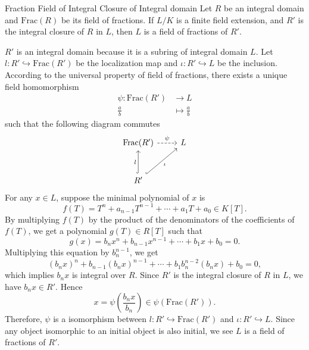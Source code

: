 \begin{proposition}{Fraction Field of Integral Closure of Integral domain}{}
    Let $R$ be an integral domain and $\mathrm{Frac}(R)$ be its field of fractions. If $L/K$ is a finite field extension, and $R'$ is the integral closure of $R$ in $L$, then $L$ is a field of fractions of $R'$.
\end{proposition}
\begin{prf}
    $R'$ is an integral domain because it is a subring of integral domain $L$. Let $l:R'\hookrightarrow \mathrm{Frac}(R') $ be the localization map and $\iota:R'\hookrightarrow L$ be the inclusion. According to the universal property of field of fractions, there exists a unique field homomorphism 
    \begin{align*}
        \psi:\mathrm{Frac}(R')&\longrightarrow L\\
        \frac{a}{b}&\longmapsto \frac{a}{b}
    \end{align*}
    such that the following diagram commutes
    \[
        \begin{tikzcd}
            \mathrm{Frac}(R') \arrow[r, "\psi", dashed]        & L \\[1em]
            R' \arrow[u, "l", hook] \arrow[ru, "\iota"', hook] &  
            \end{tikzcd}
    \]
    For any $x\in L$, suppose the minimal polynomial of $x$ is
    \[
    f(T) = T^n + a_{n-1}T^{n-1} + \cdots + a_1T + a_0 \in K[T].
    \]
    By multiplying $f(T)$ by the product of the denominators of the coefficients of $f(T)$, we get a polynomial $g(T)\in R[T]$ such that 
    \[
    g(x)=b_n x^n + b_{n-1}x^{n-1} + \cdots + b_1x + b_0 = 0.
    \]
    Multiplying this equation by $b_n^{n-1}$, we get
    \[
    (b_n x)^n + b_{n-1}(b_n x)^{n-1} + \cdots + b_1b_n^{n-2}(b_n x) + b_0 = 0,
    \]
    which implies $b_n x$ is integral over $R$. Since $R'$ is the integral closure of $R$ in $L$, we have $b_n x\in R'$. Hence 
    \[
    x=\psi\left(\frac{b_n x}{b_n}\right)\in \psi(\mathrm{Frac}(R')).
    \]
    Therefore, $\psi$ is a isomorphism between $l:R'\hookrightarrow \mathrm{Frac}(R')$ and $\iota:R'\hookrightarrow L$. Since any object isomorphic to an initial object is also initial, we see $L$ is a field of fractions of $R'$.
 
\end{prf}


